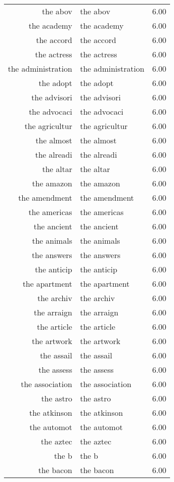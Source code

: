 \begin{table}[ht]
\begin{tabular}{rlr}
  the abov & the abov & 6.00 \\ 
  the academy & the academy & 6.00 \\ 
  the accord & the accord & 6.00 \\ 
  the actress & the actress & 6.00 \\ 
  the administration & the administration & 6.00 \\ 
  the adopt & the adopt & 6.00 \\ 
  the advisori & the advisori & 6.00 \\ 
  the advocaci & the advocaci & 6.00 \\ 
  the agricultur & the agricultur & 6.00 \\ 
  the almost & the almost & 6.00 \\ 
  the alreadi & the alreadi & 6.00 \\ 
  the altar & the altar & 6.00 \\ 
  the amazon & the amazon & 6.00 \\ 
  the amendment & the amendment & 6.00 \\ 
  the americas & the americas & 6.00 \\ 
  the ancient & the ancient & 6.00 \\ 
  the animals & the animals & 6.00 \\ 
  the answers & the answers & 6.00 \\ 
  the anticip & the anticip & 6.00 \\ 
  the apartment & the apartment & 6.00 \\ 
  the archiv & the archiv & 6.00 \\ 
  the arraign & the arraign & 6.00 \\ 
  the article & the article & 6.00 \\ 
  the artwork & the artwork & 6.00 \\ 
  the assail & the assail & 6.00 \\ 
  the assess & the assess & 6.00 \\ 
  the association & the association & 6.00 \\ 
  the astro & the astro & 6.00 \\ 
  the atkinson & the atkinson & 6.00 \\ 
  the automot & the automot & 6.00 \\ 
  the aztec & the aztec & 6.00 \\ 
  the b & the b & 6.00 \\ 
  the bacon & the bacon & 6.00 \\ 

\end{tabular}
\end{table}
